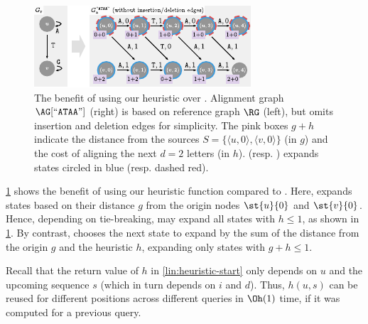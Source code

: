 \begin{figure}[t]
	\centering
	\includegraphics[width=0.9\columnwidth]{./figs/heuristic}
	\caption{The benefit of using our heuristic over \dijkstra. Alignment graph
	$\AG[``\texttt{ATAA}"]$ (right) is based on reference graph $\RG$ (left),
	but omits insertion and deletion edges for simplicity. The pink boxes $g+h$
	indicate the distance from the sources $S=\{\langle u,0 \rangle, \langle v,0
	\rangle \}$ (in $g$) and the cost of aligning the next $d=2$ letters (in
	$h$). \dijkstra (resp. \A) expands states circled in
	\textcolor{my-full-blue}{blue} (resp.
	\textcolor{my-full-red}{dashed red}).}
	\label{fig:heuristic-benefit}
\end{figure}

 \label{para:heuristic-benefits}
\cref{fig:heuristic-benefit} shows the benefit of using our heuristic function
compared to \dijkstra. Here, \dijkstra expands states based on their distance
$g$ from the origin nodes $\st{u}{0}$ and $\st{v}{0}$. Hence, depending on
tie-breaking, \dijkstra may expand all states with $h \leq 1$, as shown in
\cref{fig:heuristic-benefit}. By contrast, \A chooses the next state to expand
by the sum of the distance from the origin $g$ and the heuristic $h$, expanding
only states with $g+h \leq 1$.

 \label{para:memoization}
Recall that the return value of $h$ in \cref{lin:heuristic-start} only depends
on $u$ and the upcoming sequence $s$ (which in turn depends on $i$ and $d$).
Thus, $h(u,s)$ can be reused for different positions across different queries in
$\Oh(1)$ time, if it was computed for a previous query.